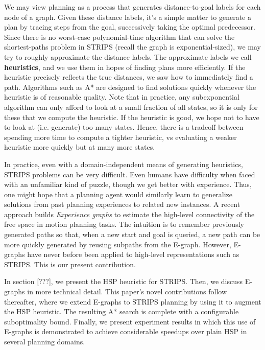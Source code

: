 \documentclass[letterpaper]{article}
\begin{document}
We may view planning as a process that generates distance-to-goal labels for each node of a graph.
Given these distance labels, it's a simple matter to generate a plan by tracing steps from the goal, successively taking the optimal predecessor.
Since there is no worst-case polynomial-time algorithm that can solve the shortest-paths problem in STRIPS (recall the graph is exponential-sized), we may try to roughly approximate the distance labels.
The approximate labels we call \textbf{heuristics}, and we use them in hopes of finding plans more efficiently.
If the heuristic precisely reflects the true distances, we saw how to immediately find a path.
Algorithms such as A* are designed to find solutions quickly whenever the heuristic is of reasonable quality.
Note that in practice, any subexponential algorithm can only afford to look at a small fraction of all states, so it is only for these that we compute the heuristic.
If the heuristic is good, we hope not to have to look at (i.e. generate) too many states.
Hence, there is a tradeoff between spending more time to compute a tighter heuristic, vs evaluating a weaker heuristic more quickly but at many more states.

In practice, even with a domain-independent means of generating heuristics, STRIPS problems can be very difficult.
Even humans have difficulty when faced with an unfamiliar kind of puzzle, though we get better with experience.
Thus, one might hope that a planning agent would similarly learn to generalize solutions from past planning experiences to related new instances.
A recent approach builds \textit{Experience graphs} to estimate the high-level connectivity of the free space in motion planning tasks.
The intuition is to remember previously generated paths so that, when a new start and goal is queried, a new path can be more quickly generated by reusing subpaths from the E-graph.
However, E-graphs have never before been applied to high-level representations such as STRIPS. This is our present contribution.

In section [???], we present the HSP heuristic for STRIPS.
Then, we discuss E-graphs in more technical detail.
This paper's novel contributions follow thereafter, where we extend E-graphs to STRIPS planning by using it to augment the HSP heuristic. 
The resulting A* search is complete with a configurable suboptimality bound.
Finally, we present experiment results in which this use of E-graphs is demonstrated to achieve considerable speedups over plain HSP in several planning domains.
\end{document}
